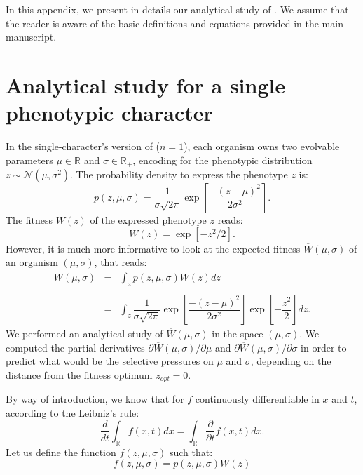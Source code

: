 
In this appendix, we present in details our analytical study of {\sigmaFGM}. We assume that the reader is aware of the basic definitions and equations provided in the main manuscript.


\section*{Analytical study for a single phenotypic character}

In the single-character's version of {\sigmaFGM} ($n=1$), each organism owns two evolvable parameters $\mu \in \mathbb{R}$ and $\sigma \in \mathbb{R}_+$, encoding for the phenotypic distribution $z \sim \mathcal{N}(\mu,\sigma^2)$. The probability density to express the phenotype $z$ is:
\begin{equation}
p(z,\mu,\sigma) = \dfrac{1}{\sigma \sqrt{2\pi}} \exp \left[ \dfrac{-(z-\mu)^2}{2\sigma^2} \right].
\end{equation}
The fitness $W(z)$ of the expressed phenotype $z$ reads:
\begin{equation}
W(z) = \exp \left[ -z^2/2 \right].
\end{equation}
However, it is much more informative to look at the expected fitness $\overline{W}(\mu,\sigma)$ of an organism $(\mu,\sigma)$, that reads:
\begin{equation}
\begin{array}{rcl}
\overline{W}(\mu,\sigma) & = & \displaystyle\int_z p(z,\mu,\sigma)W(z)dz\\\\
& = & \displaystyle\int_z \dfrac{1}{\sigma \sqrt{2\pi}} \exp \left[ \dfrac{-(z-\mu)^2}{2\sigma^2} \right] \exp \left[ -\dfrac{z^2}{2} \right] dz.
\end{array}
\label{eq:part1:mean_fitness}
\end{equation}
We performed an analytical study of $\overline{W}(\mu,\sigma)$ in the space $(\mu,\sigma)$. We computed the partial derivatives $\partial \overline{W}(\mu,\sigma)/\partial \mu$ and $\partial \overline{W}(\mu,\sigma)/\partial \sigma$ in order to predict what would be the selective pressures on $\mu$ and $\sigma$, depending on the distance from the fitness optimum $z_{opt} = 0$. 

By way of introduction, we know that for $f$ continuously differentiable in $x$ and $t$, according to the Leibniz's rule:
\begin{equation}
\dfrac{d}{dt} \int_{\mathbb{R}} f(x,t)dx = \int_{\mathbb{R}} \dfrac{\partial}{\partial t} f(x,t) dx.
\label{eq:part1:leibniz_rule}
\end{equation}
Let us define the function $f(z,\mu,\sigma)$ such that:
\begin{equation}
f(z,\mu,\sigma) = p(z,\mu,\sigma)W(z)
\label{eq:part1:f_function}
\end{equation}

